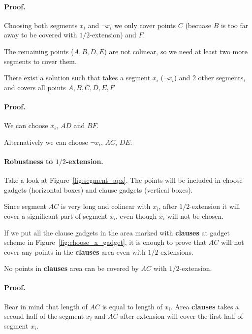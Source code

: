 \paragraph{Proof.}
Choosing both segments $x_i$ and $\neg x_i$
we only cover points $C$
(becuase $B$ is too far away to be covered with $1/2$-extension)
and $F$.

The remaining points ($A, B, D, E$) are not colinear,
so we need at least two more segments to cover them.


\begin{lemma}
\label{choose_clause_solution}
There exist a solution such that takes a segment $x_i$ ($\neg x_i$)
and 2 other segments, and covers all points $A, B, C, D, E, F$
\end{lemma}

\paragraph{Proof.}
We can choose $x_i$, $AD$ and $BF$.

Alternatively we can choose $\neg x_i$, $AC$, $DE$.

\paragraph{Robustness to $1/2$-extension.}
Take a look at Figure~\ref{fig:segment_apx}.
The points will be included in choose gadgets (horizontal boxes)
and clause gadgets (vertical boxes).

Since segment $AC$ is very long
and colinear with $x_i$, after $1/2$-extension
it will cover a significant part of segment $x_i$,
even though $x_i$ will not be chosen.

If we put all the clause gadgets in the area
marked with \textbf{clauses} at gadget scheme in Figure~\ref{fig:choose_x_gadget},
it is enough to prove that $AC$ will not cover any points
in the \textbf{clauses} area even with $1/2$-extensions.

\begin{lemma}
No points in \textbf{clauses} area can be covered
by $AC$ with $1/2$-extension.
\end{lemma}

\paragraph{Proof.}
Bear in mind that length of $AC$ is equal to length of $x_i$.
Area \textbf{clauses} takes a second half
of the segment $x_i$ and $AC$ after extension will cover the first
half of segment $x_i$.

